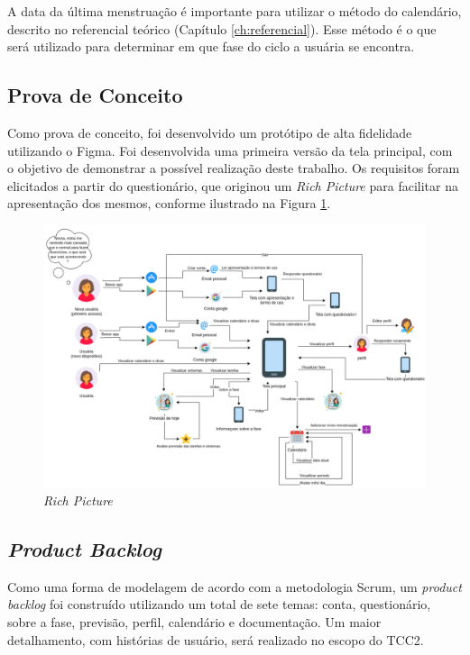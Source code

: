 A data da última menstruação é importante para utilizar o 
método do calendário, descrito no referencial teórico (Capítulo \ref{ch:referencial}). 
Esse método é o que será utilizado para determinar em que 
fase do ciclo a usuária se encontra.

\subsection{Prova de Conceito}
 
Como prova de conceito, foi desenvolvido um protótipo de alta 
fidelidade utilizando o Figma. Foi desenvolvida uma primeira versão da tela principal, 
com o objetivo de demonstrar a possível 
realização deste trabalho. Os requisitos foram elicitados 
a partir do questionário, que 
originou um \emph{Rich Picture} para facilitar na apresentação dos mesmos, conforme ilustrado na Figura \ref{fig08}.

\begin{figure}[ht]
	\centering
	\includegraphics[keepaspectratio=true,scale=0.76]{figuras/rickPicture.pdf}
	\caption{\emph{Rich Picture}}
        \label{fig08}
\end{figure}

\subsection{\emph{Product Backlog}}
Como uma forma de modelagem de acordo com a metodologia Scrum, 
um \emph{product backlog} foi construído utilizando um total de 
sete temas: conta, questionário, sobre a fase, previsão, perfil, 
calendário e documentação. Um maior 
detalhamento, com histórias de usuário, será realizado no 
escopo do TCC2.

